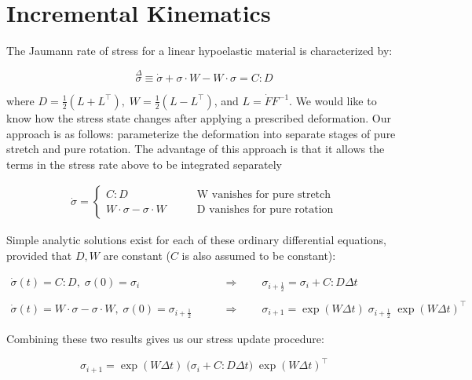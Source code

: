 \section{Incremental Kinematics}
%

\newcommand{\ds}{\displaystyle}
\newcommand{\mparen}[1]{\displaystyle \big( #1 \big)}
\newcommand{\mbrack}[1]{\displaystyle \big[ #1 \big]}
\newcommand{\bparen}[1]{\displaystyle \bigg( #1 \bigg)}
\newcommand{\bbrack}[1]{\displaystyle \bigg[ #1 \bigg]}

The Jaumann rate of stress for a linear hypoelastic material is characterized by:

$$ \overset{\Delta}{\sigma} \equiv 
\dot{\sigma} + \sigma \cdot W - W \cdot \sigma = 
C : D $$

where $ D = \frac{1}{2} (L + L^\top), \; W = \frac{1}{2} (L - L^\top)$, and $L = \dot{F}
F^{-1} $. We would like to know how the stress state changes after applying
a prescribed deformation. Our approach is as follows: parameterize the deformation
into separate stages of pure stretch and pure rotation. The advantage of this
approach is that it allows the terms in the stress rate above to be integrated
separately

\begin{align*}
\dot{\sigma} = 
\begin{cases}
C : D & \qquad \text{W vanishes for pure stretch} \\
W \cdot \sigma - \sigma \cdot W & \qquad \text{D vanishes for pure rotation}
\end{cases}
\end{align*}

Simple analytic solutions exist for each of these ordinary differential equations, 
provided that $D, W$ are constant ($C$ is also assumed to be constant):

\begin{align*}
\dot{\sigma}(t) = C : D, \; \sigma(0) = \sigma_i 
\qquad 
& \Longrightarrow 
\qquad 
\sigma_{i+\frac{1}{2}}  = \sigma_i + C : D \Delta t \\ \\
\dot{\sigma}(t) = W \cdot \sigma - \sigma \cdot W, \; \sigma(0) = \sigma_{i+\frac{1}{2}} 
\qquad 
& \Longrightarrow 
\qquad 
\sigma_{i+1} = \exp(W \Delta t) \; \sigma_{i+\frac{1}{2}} \; \exp(W \Delta t)^{\top}
\end{align*}

Combining these two results gives us our stress update procedure:

$$ \sigma_{i+1} = \exp(W \Delta t) \; \bparen{\sigma_i + C : D \Delta t} \; \exp(W \Delta t)^{\top} $$

